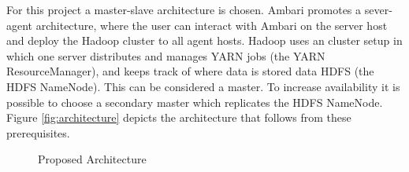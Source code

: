For this project a master-slave architecture is chosen.
Ambari promotes a sever-agent architecture, 
where the user can interact with Ambari on the server host 
and deploy the Hadoop cluster to all agent hosts.
Hadoop uses an cluster setup in which one server distributes and manages \ac{YARN} jobs (the \ac{YARN} ResourceManager), 
and keeps track of where data is stored data \ac{HDFS} (the \ac{HDFS} NameNode).
This can be considered a master.
To increase availability it is possible to choose a secondary master which replicates the \ac{HDFS} NameNode.
Figure \vref{fig:architecture} depicts the architecture that follows from these prerequisites.

\begin{figure}
	\caption{\label{fig:architecture}Proposed Architecture}
\end{figure}

